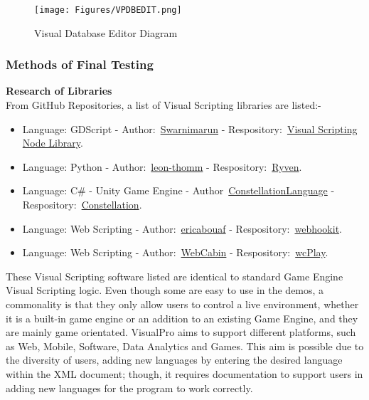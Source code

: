 \documentclass[conference]{IEEEtran}
\begin{document}
            \begin{figure}[h]
              \centering
              \texttt{[image: Figures/VPDBEDIT.png]}
              \caption{Visual Database Editor Diagram~\cite{kuspert_design_1990}}
              \label{fig:visualDBEditor}
            \end{figure}

        \subsubsection{Methods of Final Testing}
          \textbf{Research of Libraries}\\
            From GitHub Repositories, a list of Visual Scripting libraries are listed:-
            \begin{itemize}
              \item Language: GDScript - Author:~\href{https://github.com/swarnimarun}{Swarnimarun} - Respository:~\href{https://github.com/swarnimarun/visual-scripting-node-library}{Visual Scripting Node Library}.
              \item Language: Python - Author:~\href{https://github.com/leon-thomm}{leon-thomm} - Respository:~\href{https://github.com/leon-thomm/Ryven}{Ryven}.
              \item Language: C\# - Unity Game Engine - Author~\href{https://github.com/ConstellationLanguage}{ConstellationLanguage} - Respository:~\href{https://github.com/ConstellationLanguage/Constellation}{Constellation}.
              \item Language: Web Scripting - Author:~\href{https://github.com/ericabouaf}{ericabouaf} - Respository:~\href{https://github.com/ericabouaf/webhookit}{webhookit}.
              \item Language: Web Scripting - Author:~\href{https://github.com/WebCabin}{WebCabin} - Respository:~\href{https://github.com/WebCabin/wcPlay}{wcPlay}.
            \end{itemize}

            These Visual Scripting software listed are identical to standard Game Engine Visual Scripting logic. Even though some are easy to use in the demos, a commonality is that they only allow users to control a live environment, whether it is a built-in game engine or an addition to an existing Game Engine, and they are mainly game orientated. VisualPro aims to support different platforms, such as Web, Mobile, Software, Data Analytics and Games. This aim is possible due to the diversity of users, adding new languages by entering the desired language within the XML document; though, it requires documentation to support users in adding new languages for the program to work correctly.
\end{document}
